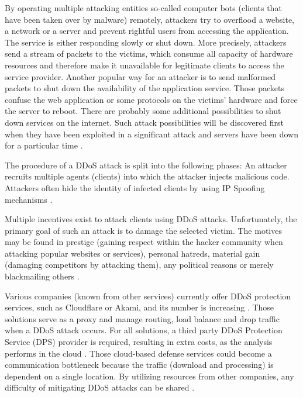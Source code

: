 By operating multiple attacking entities so-called computer bots (clients that have been taken over by malware) remotely, attackers try to overflood a website, a network or a server and prevent rightful users from accessing the application. The service is either responding slowly or shut down. More precisely, attackers send a stream of packets to the victims, which consume all capacity of hardware resources and therefore make it unavailable for legitimate clients to access the service provider. Another popular way for an attacker is to send malformed packets to shut down the availability of the application service. Those packets confuse the web application or some protocols on the victims' hardware and force the server to reboot. There are probably some additional possibilities to shut down services on the internet. Such attack possibilities will be discovered first when they have been exploited in a significant attack and servers have been down for a particular time \cite{Mirkovic2004}.

The procedure of a DDoS attack is split into the following phases: An attacker recruits multiple agents (clients) into which the attacker injects malicious code. Attackers often hide the identity of infected clients by using IP Spoofing mechanisms \cite{Mirkovic2004}.


Multiple incentives exist to attack clients using DDoS attacks. Unfortunately, the primary goal of such an attack is to damage the selected victim. The motives may be found in prestige (gaining respect within the hacker community when attacking popular websites or services), personal hatreds, material gain (damaging competitors by attacking them), any political reasons or merely blackmailing others \cite{Mansfield-Devine2015, Mirkovic2004}.

Various companies (known from other services) currently offer DDoS protection services, such as Cloudflare or Akami, and its number is increasing \cite{Pras2016}. Those solutions serve as a proxy and manage routing, load balance and drop traffic when a DDoS attack occurs. For all solutions, a third party DDoS Protection Service (DPS) provider is required, resulting in extra costs, as the analysis performs in the cloud \cite{Rodrigues2017}. Those cloud-based defense services could become a communication bottleneck because the traffic (download and processing) is dependent on a single location. By utilizing resources from other companies, any difficulty of mitigating DDoS attacks can be shared \cite{Rodrigues2017}.

